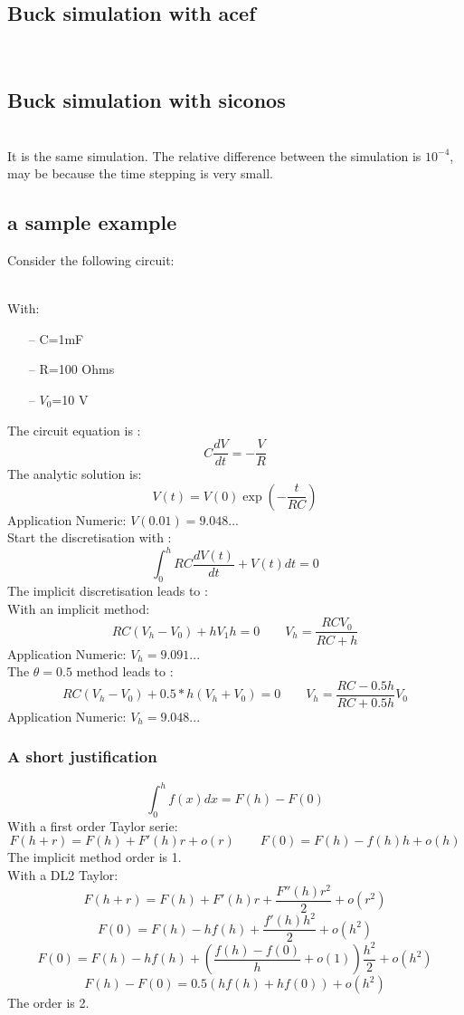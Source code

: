 \subsection{Buck simulation with acef}

\\
\subsection{Buck simulation with siconos}

\\
It is the same simulation. The relative difference between the simulation is $10^{-4}$, may be because
the time stepping is very small.
\newpage
\subsection{a sample example}
Consider the following circuit:\\
\begin{figure}[h]
\centerline{
 \scalebox{1.0}{
    
 }
}\end{figure}
\\
With:
\begin{itemize}
  \item[--] C=1mF
  \item[--] R=100 Ohms
  \item[--] $V_{0}$=10 V
\end{itemize}

The circuit equation is :
\[C\frac{dV}{dt}=-\frac{V}{R}\]
The analytic solution is:
\[V(t)=V(0)\exp(-\frac{t}{RC})\]
Application Numeric: $V(0.01)=9.048...$\\
Start the discretisation with :\\
\[\int_{0}^{h}{RC\frac{dV(t)}{dt}+V(t)}dt=0\]
The implicit discretisation leads to :\\
With an implicit method:
\[RC(V_{h}-V_{0})+hV_{1}h=0 \qquad V_{h}=\frac{RCV_{0}}{RC+h}\]
Application Numeric: $V_{h}=9.091...$\\
The $\theta=0.5$ method leads to :
\[RC(V_{h}-V_{0})+0.5*h(V_{h}+V_{0})=0 \qquad V_{h} = \frac{RC-0.5h}{RC+0.5h}V_{0}\]
Application Numeric: $V_{h}=9.048...$\\
\subsubsection{A short justification}
\[\int_{0}^{h}{f(x)}dx = F(h)-F(0)\]
With a first order Taylor serie:
\[F(h+r)=F(h)+F'(h)r+o(r) \qquad F(0)=F(h)-f(h)h+o(h)\]
The implicit method order is 1.\\
With a DL2 Taylor:
\[F(h+r)=F(h)+F'(h)r+\frac{F''(h)r^2}{2}+o(r^2)\]
\[F(0)=F(h)-hf(h)+\frac{f'(h)h^2}{2}+o(h^2) \]
\[F(0)=F(h)-hf(h)+ (\frac{f(h)-f(0)}{h}+o(1)) \frac{h^2}{2}+o(h^2)\]
\[F(h)-F(0)=0.5(hf(h)+hf(0))+o(h^2)\]
The order is 2. 

